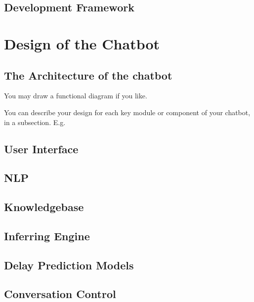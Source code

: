\documentclass[11pt]{cmpreport}
\begin{document}
\subsection{Development Framework}


\section{Design of the Chatbot}

 
\subsection{The Architecture of the chatbot}
You may draw a functional diagram if you like.  

You can describe your design for each key module or component of your chatbot, in a subsection. E.g. 
\subsection{User Interface} 

\subsection{NLP}

\subsection{Knowledgebase}

\subsection{Inferring Engine}

\subsection{Delay Prediction Models}

\subsection{Conversation Control}

%
\end{document}
